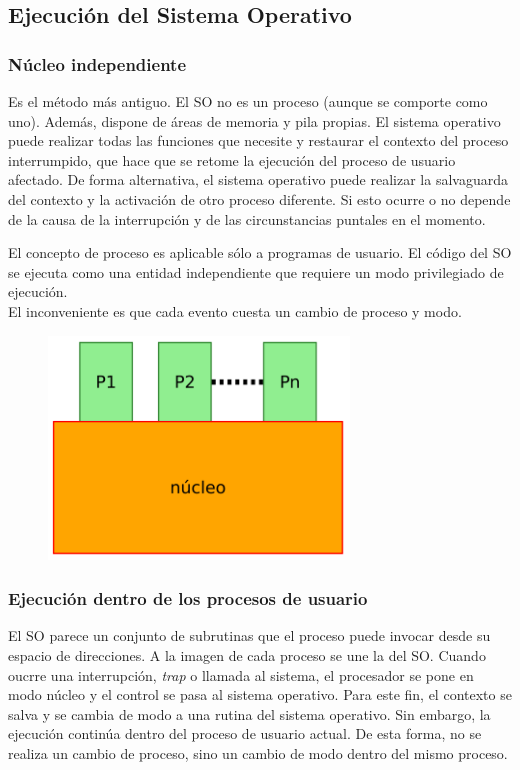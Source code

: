 \documentclass{article}
\begin{document}
\subsection{Ejecución del Sistema Operativo}
\subsubsection{Núcleo independiente}
Es el método más antiguo. El SO no es un proceso (aunque se comporte como uno). Además, dispone de áreas de memoria y pila propias. El sistema operativo puede realizar todas las funciones que necesite y restaurar el contexto del proceso interrumpido, que hace que se retome la ejecución del proceso de usuario afectado. De forma alternativa, el sistema operativo puede realizar la salvaguarda del contexto y la activación de otro proceso diferente. Si esto ocurre o no depende de la causa de la interrupción y de las circunstancias puntales en el momento. 

El concepto de proceso es aplicable sólo a programas de usuario. El código del SO se ejecuta como una entidad independiente que requiere un modo privilegiado de ejecución.\\

El inconveniente es que cada evento cuesta un cambio de proceso y modo.

\begin{figure}[h]
\centering
\includegraphics[scale=1,width=80mm]{nucleo_independiente.png}
\end{figure}

\subsubsection{Ejecución dentro de los procesos de usuario}
El SO parece un conjunto de subrutinas que el proceso puede invocar desde su espacio de direcciones. A la imagen de cada proceso se une la del SO. Cuando oucrre una interrupción, \textit{trap} o llamada al sistema, el procesador se pone en modo núcleo y el control se pasa al sistema operativo. Para este fin, el contexto se salva y se cambia de modo a una rutina del sistema operativo. Sin embargo, la ejecución continúa dentro del proceso de usuario actual. De esta forma, no se realiza un cambio de proceso, sino un cambio de modo dentro del mismo proceso.\\
\end{document}
